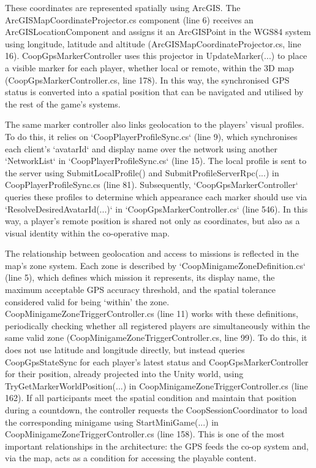 These coordinates are represented spatially using ArcGIS. The ArcGISMapCoordinateProjector.cs component (line 6) receives an ArcGISLocationComponent and assigns it an ArcGISPoint in the WGS84 system using longitude, latitude and altitude (ArcGISMapCoordinateProjector.cs, line 16). CoopGpsMarkerController uses this projector in UpdateMarker(...) to place a visible marker for each player, whether local or remote, within the 3D map (CoopGpsMarkerController.cs, line 178). In this way, the synchronised GPS status is converted into a spatial position that can be navigated and utilised by the rest of the game’s systems.

The same marker controller also links geolocation to the players’ visual profiles. To do this, it relies on `CoopPlayerProfileSync.cs` (line 9), which synchronises each client’s `avatarId` and display name over the network using another `NetworkList` in `CoopPlayerProfileSync.cs` (line 15). The local profile is sent to the server using SubmitLocalProfile() and SubmitProfileServerRpc(...) in CoopPlayerProfileSync.cs (line 81). Subsequently, `CoopGpsMarkerController` queries these profiles to determine which appearance each marker should use via `ResolveDesiredAvatarId(...)` in `CoopGpsMarkerController.cs` (line 546). In this way, a player’s remote position is shared not only as coordinates, but also as a visual identity within the co-operative map.

The relationship between geolocation and access to missions is reflected in the map’s zone system. Each zone is described by `CoopMinigameZoneDefinition.cs` (line 5), which defines which mission it represents, its display name, the maximum acceptable GPS accuracy threshold, and the spatial tolerance considered valid for being ‘within’ the zone. CoopMinigameZoneTriggerController.cs (line 11) works with these definitions, periodically checking whether all registered players are simultaneously within the same valid zone (CoopMinigameZoneTriggerController.cs, line 99). To do this, it does not use latitude and longitude directly, but instead queries CoopGpsStateSync for each player’s latest status and CoopGpsMarkerController for their position, already projected into the Unity world, using TryGetMarkerWorldPosition(...) in CoopMinigameZoneTriggerController.cs (line 162). If all participants meet the spatial condition and maintain that position during a countdown, the controller requests the CoopSessionCoordinator to load the corresponding minigame using StartMiniGame(...) in CoopMinigameZoneTriggerController.cs (line 158). This is one of the most important relationships in the architecture: the GPS feeds the co-op system and, via the map, acts as a condition for accessing the playable content.

